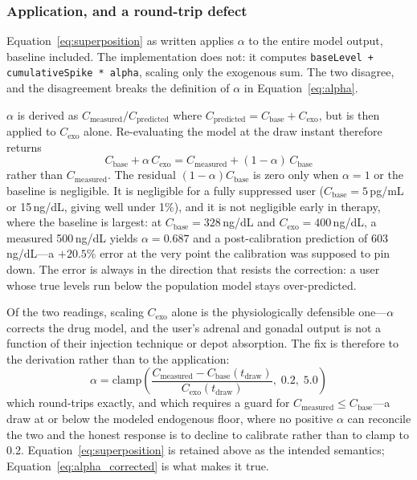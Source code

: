 \documentclass[11pt,a4paper]{article}
\newcommand{\code}[1]{\texttt{\small #1}}
\begin{document}
\subsubsection{Application, and a round-trip defect}

Equation~\ref{eq:superposition} as written applies $\alpha$ to the entire
model output, baseline included. The implementation does not: it computes
\code{baseLevel + cumulativeSpike * alpha}, scaling only the exogenous
sum. The two disagree, and the disagreement breaks the definition of
$\alpha$ in Equation~\ref{eq:alpha}.

$\alpha$ is derived as $C_{\text{measured}} / C_{\text{predicted}}$ where
$C_{\text{predicted}} = C_{\text{base}} + C_{\text{exo}}$, but is then
applied to $C_{\text{exo}}$ alone. Re-evaluating the model at the draw
instant therefore returns
\[
C_{\text{base}} + \alpha\, C_{\text{exo}}
= C_{\text{measured}} + (1-\alpha)\,C_{\text{base}}
\]
rather than $C_{\text{measured}}$. The residual $(1-\alpha) C_{\text{base}}$
is zero only when $\alpha = 1$ or the baseline is negligible. It is
negligible for a fully suppressed user ($C_{\text{base}} = 5$\,pg/mL or
15\,ng/dL, giving well under 1\%), and it is not negligible early in
therapy, where the baseline is largest: at $C_{\text{base}} = 328$\,ng/dL
and $C_{\text{exo}} = 400$\,ng/dL, a measured 500\,ng/dL yields
$\alpha = 0.687$ and a post-calibration prediction of 603\,ng/dL---a
$+20.5\%$ error at the very point the calibration was supposed to pin down.
The error is always in the direction that resists the correction: a user
whose true levels run below the population model stays over-predicted.

Of the two readings, scaling $C_{\text{exo}}$ alone is the physiologically
defensible one---$\alpha$ corrects the drug model, and the user's adrenal
and gonadal output is not a function of their injection technique or
depot absorption. The fix is therefore to the derivation rather than to the
application:
\begin{equation}
\alpha = \mathrm{clamp}\!\left(\frac{C_{\text{measured}} - C_{\text{base}}(t_{\text{draw}})}{C_{\text{exo}}(t_{\text{draw}})},\; 0.2,\; 5.0\right)
\label{eq:alpha_corrected}
\end{equation}
which round-trips exactly, and which requires a guard for
$C_{\text{measured}} \le C_{\text{base}}$---a draw at or below the modeled
endogenous floor, where no positive $\alpha$ can reconcile the two and the
honest response is to decline to calibrate rather than to clamp to 0.2.
Equation~\ref{eq:superposition} is retained above as the intended
semantics; Equation~\ref{eq:alpha_corrected} is what makes it true.
\end{document}
